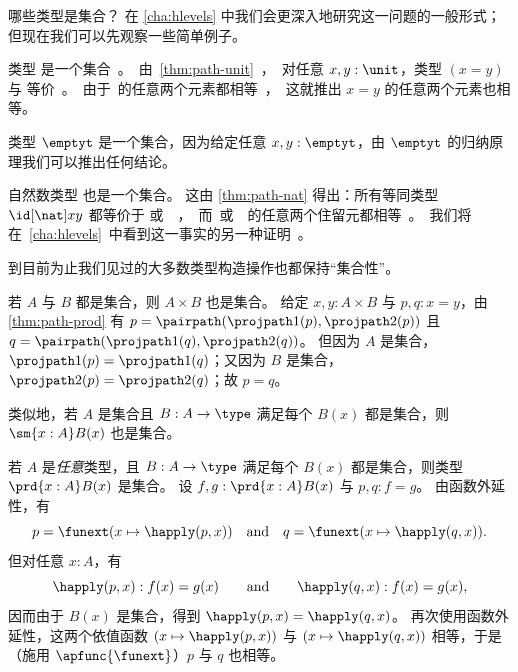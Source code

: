 哪些类型是集合？
在 \cref{cha:hlevels} 中我们会更深入地研究这一问题的一般形式；但现在我们可以先观察一些简单例子。

\begin{eg}\label{eg:isset-unit}
  类型 \unit 是一个集合。
  由 \cref{thm:path-unit}，对任意 $x,y:\unit$，类型 $(x=y)$ 与 \unit 等价。
  由于 \unit 的任意两个元素都相等，这就推出 $x=y$ 的任意两个元素也相等。
\end{eg}

\begin{eg}\label{eg:isset-empty}
  类型 $\emptyt$ 是一个集合，因为给定任意 $x,y:\emptyt$，由 $\emptyt$ 的归纳原理我们可以推出任何结论。
\end{eg}

\begin{eg}\label{thm:nat-set}
  自然数类型 \nat 也是一个集合。
  这由 \cref{thm:path-nat} 得出：所有等同类型 $\id[\nat]xy$ 都等价于 \unit 或 \emptyt，而 \unit 或 \emptyt 的任意两个住留元都相等。
  我们将在 \cref{cha:hlevels} 中看到这一事实的另一种证明。
\end{eg}

到目前为止我们见过的大多数类型构造操作也都保持“集合性”。

\begin{eg}\label{thm:isset-prod}
  若 $A$ 与 $B$ 都是集合，则 $A\times B$ 也是集合。
  给定 $x,y:A\times B$ 与 $p,q:x=y$，由 \cref{thm:path-prod} 有 $p= \pairpath(\projpath1(p),\projpath2(p))$ 且 $q= \pairpath(\projpath1(q),\projpath2(q))$。
  但因为 $A$ 是集合，$\projpath1(p)=\projpath1(q)$；又因为 $B$ 是集合，$\projpath2(p)=\projpath2(q)$；故 $p=q$。

  类似地，若 $A$ 是集合且 $B:A\to\type$ 满足每个 $B(x)$ 都是集合，则 $\sm{x:A} B(x)$ 也是集合。
\end{eg}

\begin{eg}\label{thm:isset-forall}
  若 $A$ 是\emph{任意}类型，且 $B:A\to \type$ 满足每个 $B(x)$ 都是集合，则类型 $\prd{x:A} B(x)$ 是集合。
  设 $f,g:\prd{x:A} B(x)$ 与 $p,q:f=g$。
  由函数外延性，有
  \begin{equation*}
    p = {\funext (x \mapsto \happly(p,x))}
    \quad\text{and}\quad
    q = {\funext (x \mapsto \happly(q,x))}.
  \end{equation*}
  但对任意 $x:A$，有
  \begin{equation*}
   \happly(p,x):f(x)=g(x)
   \qquad\text{and}\qquad
   \happly(q,x):f(x)=g(x),
  \end{equation*}
  因而由于 $B(x)$ 是集合，得到 $\happly(p,x) = \happly(q,x)$。
  再次使用函数外延性，这两个依值函数 $(x \mapsto \happly(p,x))$ 与 $(x \mapsto \happly(q,x))$ 相等，于是（施用 $\apfunc{\funext}$）$p$ 与 $q$ 也相等。
\end{eg}

